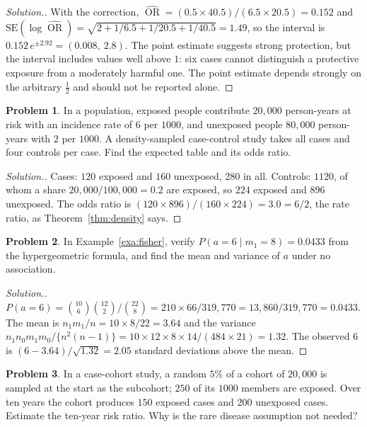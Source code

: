 \documentclass[11pt,a4paper]{article}
\numberwithin{equation}{section}
\DeclareMathOperator{\OR}{OR}
\theoremstyle{definition}
\newtheorem{problemx}{Problem}[subsection]
\newenvironment{problem}{\begin{problemx}}{\end{problemx}}
\newenvironment{solution}
  {\renewcommand{\qedsymbol}{}\begin{proof}[\textit{Solution}.]}
  {\end{proof}}
\begin{document}
\begin{solution}
With the correction, $\widehat{\OR} = (0.5 \times 40.5)/(6.5 \times 20.5) = 0.152$ and $\text{SE}(\log\widehat{\OR}) = \sqrt{2 + 1/6.5 + 1/20.5 + 1/40.5} = 1.49$, so the interval
is $0.152\,e^{\pm 2.92} = (0.008,\ 2.8)$. The point estimate suggests strong protection, but the interval includes values well above $1$:
six cases cannot distinguish a protective exposure from a moderately harmful one. The point estimate depends strongly on the
arbitrary $\tfrac12$ and should not be reported alone.
\end{solution}

\begin{problem}
In a population, exposed people contribute $20{,}000$ person-years at risk with an incidence rate of $6$ per $1000$, and unexposed people
$80{,}000$ person-years with $2$ per $1000$. A density-sampled case-control study takes all cases and four controls per case. Find the
expected table and its odds ratio.
\end{problem}

\begin{solution}
Cases: $120$ exposed and $160$ unexposed, $280$ in all. Controls: $1120$, of whom a share $20{,}000/100{,}000 = 0.2$ are exposed, so $224$ exposed and $896$
unexposed. The odds ratio is $(120 \times 896)/(160 \times 224) = 3.0 = 6/2$, the rate ratio, as Theorem~\ref{thm:density} says.
\end{solution}

\begin{problem}
In Example~\ref{exa:fisher}, verify $P(a = 6 \mid m_1 = 8) = 0.0433$ from the hypergeometric formula, and find the mean and variance of $a$ under
no association.
\end{problem}

\begin{solution}
$P(a = 6) = \binom{10}{6}\binom{12}{2}/\binom{22}{8} = 210 \times 66/319{,}770 = 13{,}860/319{,}770 = 0.0433$. The mean is
$n_1 m_1/n = 10 \times 8/22 = 3.64$ and the variance $n_1 n_0 m_1 m_0/\{n^2(n - 1)\} = 10 \times 12 \times 8 \times 14/(484 \times 21) = 1.32$. The observed $6$ is
$(6 - 3.64)/\sqrt{1.32} = 2.05$ standard deviations above the mean.
\end{solution}

\begin{problem}
In a case-cohort study, a random $5\%$ of a cohort of $20{,}000$ is sampled at the start as the subcohort; $250$ of its $1000$ members
are exposed. Over ten years the cohort produces $150$ exposed cases and $200$ unexposed cases. Estimate the ten-year risk ratio. Why is
the rare disease assumption not needed?
\end{problem}
\end{document}

